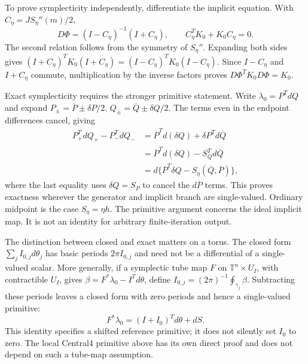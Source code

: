 To prove symplecticity independently, differentiate the implicit equation. With $C_\eta=JS_\eta''(m)/2$,
\begin{equation}
 D\Phi=(I-C_\eta)^{-1}(I+C_\eta),\qquad
 C_\eta^TK_0+K_0C_\eta=0.
 \label{eq:sup-cayley}
\end{equation}
The second relation follows from the symmetry of $S_\eta''$. Expanding both sides gives $(I+C_\eta)^TK_0(I+C_\eta)=(I-C_\eta)^TK_0(I-C_\eta)$. Since $I-C_\eta$ and $I+C_\eta$ commute, multiplication by the inverse factors proves $D\Phi^TK_0D\Phi=K_0$.

Exact symplecticity requires the stronger primitive statement. Write $\lambda_0=P^TdQ$ and expand $P_\pm=\overline P\pm\delta P/2$, $Q_\pm=\overline Q\pm\delta Q/2$. The terms even in the endpoint differences cancel, giving
\begin{align}
 P_+^TdQ_+-P_-^TdQ_-
 &=\overline P^Td(\delta Q)+\delta P^Td\overline Q\\
 &=\overline P^Td(\delta Q)-S_Q^Td\overline Q\\
 &=d\{\overline P^T\delta Q-S_\eta(\overline Q,\overline P)\},
 \label{eq:sup-exact-primitive}
\end{align}
where the last equality uses $\delta Q=S_P$ to cancel the $d\overline P$ terms. This proves exactness wherever the generator and implicit branch are single-valued. Ordinary midpoint is the case $S_\eta=\eta h$. The primitive argument concerns the ideal implicit map. It is not an identity for arbitrary finite-iteration output.

The distinction between closed and exact matters on a torus. The closed form $\sum_j I_{0,j}d\theta_j$ has basic periods $2\pi I_{0,j}$ and need not be a differential of a single-valued scalar. More generally, if a symplectic tube map $F$ on $\mathbb T^n\times U_I$, with contractible $U_I$, gives $\beta=F^*\lambda_0-I^Td\theta$, define $I_{0,j}=(2\pi)^{-1}\oint_{\gamma_j}\beta$. Subtracting these periods leaves a closed form with zero periods and hence a single-valued primitive:
\begin{equation}
 F^*\lambda_0=(I+I_0)^Td\theta+dS.
 \label{eq:sup-action-shift}
\end{equation}
This identity specifies a shifted reference primitive; it does not silently set $I_0$ to zero. The local Central4 primitive above has its own direct proof and does not depend on such a tube-map assumption.

